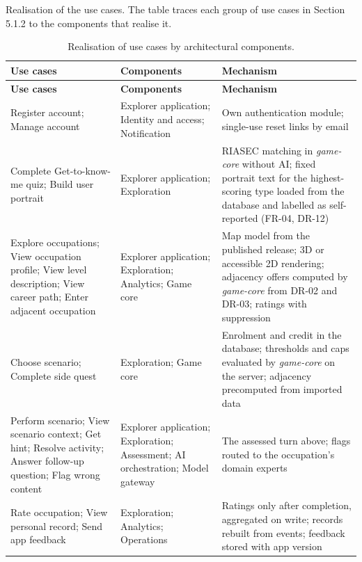 Realisation of the use cases. The table traces each group of use cases in Section 5.1.2 to the components that realise it.

{\small
\begin{longtable}{|>{\raggedright\arraybackslash}p{}|>{\raggedright\arraybackslash}p{}|>{\raggedright\arraybackslash}p{}|}
\caption{Realisation of use cases by architectural components.} \\
\hline
\textbf{Use cases} & \textbf{Components} & \textbf{Mechanism} \\ \hline
\endfirsthead
\hline
\textbf{Use cases} & \textbf{Components} & \textbf{Mechanism} \\ \hline
\endhead
Register account; Manage account & Explorer application; Identity and access; Notification & Own authentication module; single-use reset links by email \\ \hline
Complete Get-to-know-me quiz; Build user portrait & Explorer application; Exploration & RIASEC matching in \textit{game-core} without AI; fixed portrait text for the highest-scoring type loaded from the database and labelled as self-reported (FR-04, DR-12) \\ \hline
Explore occupations; View occupation profile; View level description; View career path; Enter adjacent occupation & Explorer application; Exploration; Analytics; Game core & Map model from the published release; 3D or accessible 2D rendering; adjacency offers computed by \textit{game-core} from DR-02 and DR-03; ratings with suppression \\ \hline
Choose scenario; Complete side quest & Exploration; Game core & Enrolment and credit in the database; thresholds and caps evaluated by \textit{game-core} on the server; adjacency precomputed from imported data \\ \hline
Perform scenario; View scenario context; Get hint; Resolve activity; Answer follow-up question; Flag wrong content & Explorer application; Exploration; Assessment; AI orchestration; Model gateway & The assessed turn above; flags routed to the occupation's domain experts \\ \hline
Rate occupation; View personal record; Send app feedback & Exploration; Analytics; Operations & Ratings only after completion, aggregated on write; records rebuilt from events; feedback stored with app version \\ \hline

\end{longtable}}
